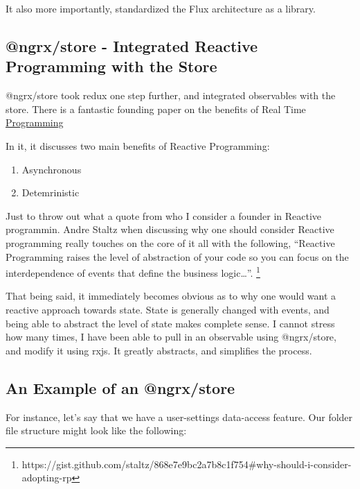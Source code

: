 It also more importantly, standardized the Flux architecture as a library.

\subsection{@ngrx/store - Integrated Reactive Programming with the Store}
@ngrx/store took redux one step further, and integrated observables with the
store. There is a fantastic founding paper on the benefits of Real Time
\href{http://www-sop.inria.fr/members/Gerard.Berry/Papers/Berry-IFIP-89.pdf}{Programming}

In it, it discusses two main benefits of Reactive Programming:
\begin{enumerate}
  \item Asynchronous
  \item Detemrinistic
\end{enumerate}

Just to throw out what a quote from who I consider a founder in Reactive
programmin. Andre Staltz when discussing why one should consider Reactive
programming really touches on the core of it all with the following, “Reactive
Programming raises the level of abstraction of your code so you can focus on the interdependence of events that define the business logic…”.
\footnote{https://gist.github.com/staltz/868e7e9bc2a7b8c1f754\#why-should-i-consider-adopting-rp}

That being said, it immediately becomes obvious as to why one would want a
reactive approach towards state. State is generally changed with events, and
being able to abstract the level of state makes complete sense. I cannot stress
how many times, I have been able to pull in an observable using @ngrx/store, and
modify it using rxjs. It greatly abstracts, and simplifies the process.


\subsection{ An Example of an @ngrx/store }

For instance, let's say that we have a user-settings data-access feature. Our
folder file structure might look like the following:

